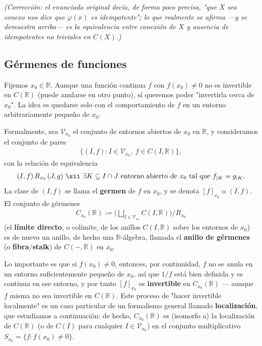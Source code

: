 \emph{(Corrección: el enunciado original decía, de forma poco precisa, "que $X$ sea conexo nos dice que $\varphi(x)$ es idempotente"; lo que realmente se afirma —y se demuestra arriba— es la equivalencia entre conexión de $X$ y ausencia de idempotentes no triviales en $C(X)$.)}

\subsection{Gérmenes de funciones}

Fijemos $x_0\in \mathbb{R}$. Aunque una función continua $f$ con $f(x_0)\neq 0$ no es invertible en $C(\mathbb{R})$ (puede anularse en otro punto), sí queremos poder "invertirla cerca de $x_0$". La idea es quedarse solo con el comportamiento de $f$ en un entorno arbitrariamente pequeño de $x_0$.

Formalmente, sea $\mathcal V_{x_0}$ el conjunto de entornos abiertos de $x_0$ en $\mathbb{R}$, y consideramos el conjunto de pares
\begin{gather*}
    \{(I, f) : I \in \mathcal V_{x_0},\ f\in C(I, \mathbb{R})\},
\end{gather*}
con la relación de equivalencia
\begin{gather*}
    (I,f)\, R_{x_0}\, (J,g) \ \sii\ \exists K\subseteq I\cap J \text{ entorno abierto de } x_0 \text{ tal que } f_{|K} = g_{|K}.
\end{gather*}
La clase de $(I,f)$ se llama el \textbf{germen} de $f$ en $x_0$, y se denota $[f]_{x_0}$ o $\overline{(I,f)}$. El conjunto de gérmenes
\begin{gather*}
    C_{x_0}(\mathbb{R}) := \Big(\bigsqcup_{I\in \mathcal V_{x_0}} C(I,\mathbb{R})\Big)\Big/ R_{x_0}
\end{gather*}
(el \textbf{límite directo}, o colímite, de los anillos $C(I,\mathbb{R})$ sobre los entornos de $x_0$) es de nuevo un anillo, de hecho una $\mathbb{R}$-álgebra, llamada el \textbf{anillo de gérmenes} (o \textbf{fibra}/\textbf{stalk}) de $C(-,\mathbb{R})$ en $x_0$.

Lo importante es que si $f(x_0)\neq 0$, entonces, por continuidad, $f$ no se anula en un entorno suficientemente pequeño de $x_0$, así que $1/f$ está bien definida y es continua en ese entorno, y por tanto $[f]_{x_0}$ es \textbf{invertible} en $C_{x_0}(\mathbb{R})$ — aunque $f$ misma no sea invertible en $C(\mathbb{R})$. Este proceso de "hacer invertible localmente" es un caso particular de un formalismo general llamado \textbf{localización}, que estudiamos a continuación: de hecho, $C_{x_0}(\mathbb{R})$ es (isomorfo a) la localización de $C(\mathbb{R})$ (o de $C(I)$ para cualquier $I\in\mathcal V_{x_0}$) en el conjunto multiplicativo $S_{x_0}=\{f : f(x_0)\neq 0\}$.

